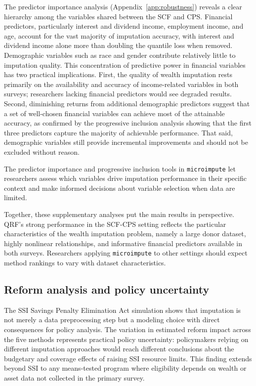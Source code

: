 The predictor importance analysis (Appendix~\ref{app:robustness}) reveals a clear hierarchy among the variables shared between the SCF and CPS. Financial predictors, particularly interest and dividend income, employment income, and age, account for the vast majority of imputation accuracy, with interest and dividend income alone more than doubling the quantile loss when removed. Demographic variables such as race and gender contribute relatively little to imputation quality. This concentration of predictive power in financial variables has two practical implications. First, the quality of wealth imputation rests primarily on the availability and accuracy of income-related variables in both surveys; researchers lacking financial predictors would see degraded results. Second, diminishing returns from additional demographic predictors suggest that a set of well-chosen financial variables can achieve most of the attainable accuracy, as confirmed by the progressive inclusion analysis showing that the first three predictors capture the majority of achievable performance. That said, demographic variables still provide incremental improvements and should not be excluded without reason.

The predictor importance and progressive inclusion tools in \texttt{microimpute} let researchers assess which variables drive imputation performance in their specific context and make informed decisions about variable selection when data are limited.

Together, these supplementary analyses put the main results in perspective. QRF's strong performance in the SCF-CPS setting reflects the particular characteristics of the wealth imputation problem, namely a large donor dataset, highly nonlinear relationships, and informative financial predictors available in both surveys. Researchers applying \texttt{microimpute} to other settings should expect method rankings to vary with dataset characteristics.

\subsection{Reform analysis and policy uncertainty}

The SSI Savings Penalty Elimination Act simulation shows that imputation is not merely a data preprocessing step but a modeling choice with direct consequences for policy analysis. The variation in estimated reform impact across the five methods represents practical policy uncertainty: policymakers relying on different imputation approaches would reach different conclusions about the budgetary and coverage effects of raising SSI resource limits. This finding extends beyond SSI to any means-tested program where eligibility depends on wealth or asset data not collected in the primary survey.

